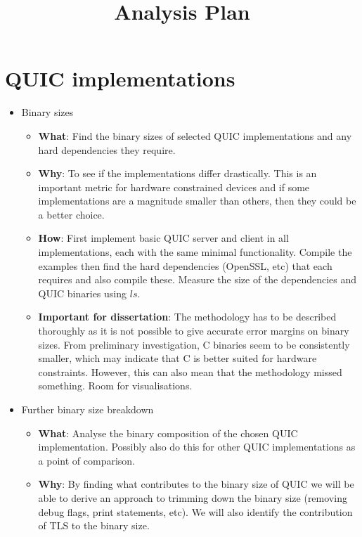 \documentclass[a4paper,11pt]{article}
\title{Analysis Plan}
\begin{document}
\maketitle

\section*{QUIC implementations}

\begin{itemize}
    \item Binary sizes
        \begin{itemize}
            \item \textbf{What}: Find the binary sizes of selected QUIC implementations and any hard dependencies they require.
            \item \textbf{Why}: To see if the implementations differ drastically. This is an important metric for hardware constrained devices and if some implementations are a magnitude smaller than others, then they could be a better choice.
            \item \textbf{How}: First implement basic QUIC server and client in all implementations, each with the same minimal functionality. Compile the examples then find the hard dependencies (OpenSSL, etc) that each requires and also compile these. Measure the size of the dependencies and QUIC binaries using $ls$.
            \item \textbf{Important for dissertation}: The methodology has to be described thoroughly as it is not possible to give accurate error margins on binary sizes. From preliminary investigation, C binaries seem to be consistently smaller, which may indicate that C is better suited for hardware constraints. However, this can also mean that the methodology missed something. Room for visualisations.
        \end{itemize}
    \item Further binary size breakdown
        \begin{itemize}
            \item \textbf{What}: Analyse the binary composition of the chosen QUIC implementation. Possibly also do this for other QUIC implementations as a point of comparison.
            \item \textbf{Why}: By finding what contributes to the binary size of QUIC we will be able to derive an approach to trimming down the binary size (removing debug flags, print statements, etc). We will also identify the contribution of TLS to the binary size.

\end{itemize}
\end{itemize}
\end{document}
